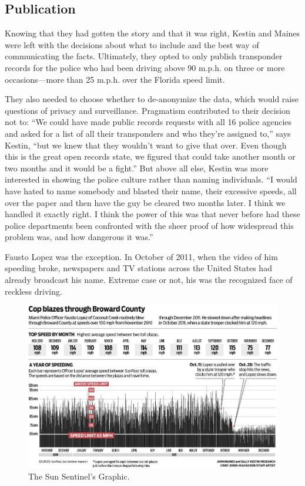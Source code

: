 \subsection{Publication}
Knowing that they had gotten the story and that it was right, Kestin and
Maines were left with the decisions about what to include and the best way
of communicating the facts. Ultimately, they opted to only publish transponder
records for the police who had been driving above 90 m.p.h. on
three or more occasions—more than 25 m.p.h. over the Florida speed limit.

They also needed to choose whether to de-anonymize the data, which would
raise questions of privacy and surveillance. Pragmatism contributed to their
decision not to: ``We could have made public records requests with all 16
police agencies and asked for a list of all their transponders and who they're
assigned to,'' says Kestin, ``but we knew that they wouldn't want to give that
over. Even though this is the great open records state, we figured that could
take another month or two months and it would be a fight.'' But above all
else, Kestin was more interested in showing the police culture rather than
naming individuals. ``I would have hated to name somebody and blasted
their name, their excessive speeds, all over the paper and then have the guy
be cleared two months later. I think we handled it exactly right. I think the
power of this was that never before had these police departments been confronted
with the sheer proof of how widespread this problem was, and how
dangerous it was.''

Fausto Lopez was the exception. In October of 2011, when the video of him
speeding broke, newspapers and TV stations across the United States had
already broadcast his name. Extreme case or not, his was the recognized
face of reckless driving.

    \begin{figure}
    \includegraphics{images/SunSentinalCopsBlaze.jpg}
    \caption{The Sun Sentinel's Graphic.}
    \end{figure}

